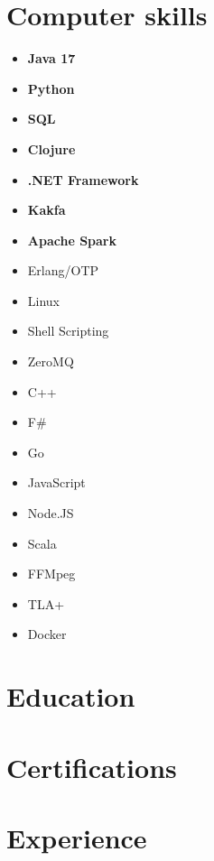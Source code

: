 \documentclass[11pt,a4paper,roman,english]{moderncv}        %
\begin{document}


\makecvtitle
\section{Computer skills}
\begin{multicols}{4}
	\begin{itemize}
		\item[] \textbf{Java 17}
		\item[] \textbf{Python}
		\item[] \textbf{SQL}
		\item[] \textbf{Clojure}
		\item[] \textbf{.NET Framework}
		\item[] \textbf{Kakfa}
		\item[] \textbf{Apache Spark}
		\item[] Erlang/OTP
		\item[] Linux
		\item[] Shell Scripting
		\item[] ZeroMQ
		\item[] C++
		\item[] F\#
		\item[] Go
		\item[] JavaScript
		\item[] Node.JS
		\item[] Scala
		\item[] FFMpeg
        \item[] TLA+
        \item[] Docker
	\end{itemize}
\end{multicols}
\section{Education}
\section{Certifications}
\section{Experience}
\end{document}
